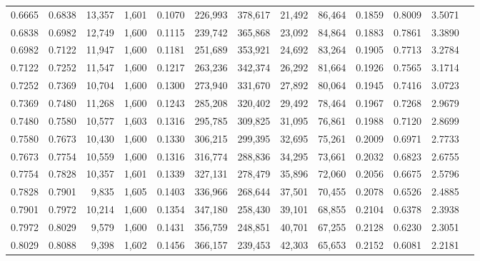 \begin{tabular}{rrrrrrrrrrrrr}
0.6665 & 0.6838 & 13,357 & 1,601 &                                     0.1070 & 226,993 & 378,617 &  21,492 &  86,464 & 0.1859 & 0.8009 & 3.5071 \\
0.6838 & 0.6982 & 12,749 & 1,600 &                                     0.1115 & 239,742 & 365,868 &  23,092 &  84,864 & 0.1883 & 0.7861 & 3.3890 \\
0.6982 & 0.7122 & 11,947 & 1,600 &                                     0.1181 & 251,689 & 353,921 &  24,692 &  83,264 & 0.1905 & 0.7713 & 3.2784 \\
0.7122 & 0.7252 & 11,547 & 1,600 &                                     0.1217 & 263,236 & 342,374 &  26,292 &  81,664 & 0.1926 & 0.7565 & 3.1714 \\
0.7252 & 0.7369 & 10,704 & 1,600 &                                     0.1300 & 273,940 & 331,670 &  27,892 &  80,064 & 0.1945 & 0.7416 & 3.0723 \\
0.7369 & 0.7480 & 11,268 & 1,600 &                                     0.1243 & 285,208 & 320,402 &  29,492 &  78,464 & 0.1967 & 0.7268 & 2.9679 \\
0.7480 & 0.7580 & 10,577 & 1,603 &                                     0.1316 & 295,785 & 309,825 &  31,095 &  76,861 & 0.1988 & 0.7120 & 2.8699 \\
0.7580 & 0.7673 & 10,430 & 1,600 &                                     0.1330 & 306,215 & 299,395 &  32,695 &  75,261 & 0.2009 & 0.6971 & 2.7733 \\
0.7673 & 0.7754 & 10,559 & 1,600 &                                     0.1316 & 316,774 & 288,836 &  34,295 &  73,661 & 0.2032 & 0.6823 & 2.6755 \\
0.7754 & 0.7828 & 10,357 & 1,601 &                                     0.1339 & 327,131 & 278,479 &  35,896 &  72,060 & 0.2056 & 0.6675 & 2.5796 \\
0.7828 & 0.7901 &  9,835 & 1,605 &                                     0.1403 & 336,966 & 268,644 &  37,501 &  70,455 & 0.2078 & 0.6526 & 2.4885 \\
0.7901 & 0.7972 & 10,214 & 1,600 &                                     0.1354 & 347,180 & 258,430 &  39,101 &  68,855 & 0.2104 & 0.6378 & 2.3938 \\
0.7972 & 0.8029 &  9,579 & 1,600 &                                     0.1431 & 356,759 & 248,851 &  40,701 &  67,255 & 0.2128 & 0.6230 & 2.3051 \\
0.8029 & 0.8088 &  9,398 & 1,602 &                                     0.1456 & 366,157 & 239,453 &  42,303 &  65,653 & 0.2152 & 0.6081 & 2.2181 \\

\end{tabular}
